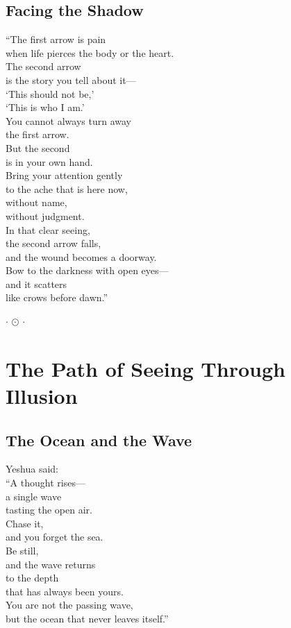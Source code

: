 \documentclass[10pt, openright]{book}
\newcommand{\sectionbreak}{\filbreak}
\newcommand{\ornament}{
    \vspace{1.5cm}
    \begin{center}
        \large \(\cdot\) \(\odot\) \(\cdot\)
    \end{center}
    \vspace{1.5cm}
}
\begin{document}
\sectionbreak

\section{Facing the Shadow}\label{facing-the-shadow}

``The first arrow is pain\\
when life pierces the body or the heart.\\
The second arrow\\
is the story you tell about it---\\
`This should not be,'\\
`This is who I am.'\\
You cannot always turn away\\
the first arrow.\\
But the second\\
is in your own hand.\\
Bring your attention gently\\
to the ache that is here now,\\
without name,\\
without judgment.\\
In that clear seeing,\\
the second arrow falls,\\
and the wound becomes a doorway.\\
Bow to the darkness with open eyes---\\
and it scatters\\
like crows before dawn.''

\ornament

\chapter{The Path of Seeing Through
Illusion}\label{the-path-of-seeing-through-illusion}

\sectionbreak

\section{The Ocean and the Wave}\label{the-ocean-and-the-wave}

Yeshua said:\\
``A thought rises---\\
a single wave\\
tasting the open air.\\
Chase it,\\
and you forget the sea.\\
Be still,\\
and the wave returns\\
to the depth\\
that has always been yours.\\
You are not the passing wave,\\
but the ocean that never leaves itself.''
\end{document}

